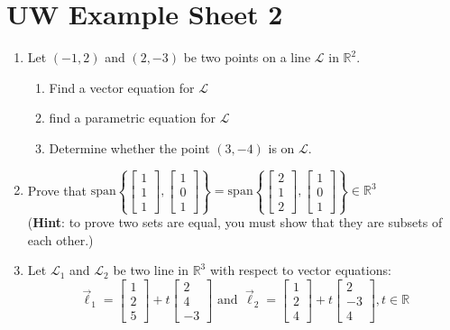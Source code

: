 \documentclass{report}
\newcommand{\R}{{\mathbb{R}}}
\begin{document}
\chapter*{UW Example Sheet 2}
\begin{enumerate}
    \item Let $(-1, 2)$ and $(2, -3)$ be two points on a line $\mathcal{L}$ in $\R^2$.
    \begin{enumerate}
        \item Find a vector equation for $\mathcal{L}$
        \item find a parametric equation for $\mathcal{L}$
        \item Determine whether the point $(3, -4)$ is on $\mathcal{L}$.
    \end{enumerate}
    \item Prove that $\text{span} \left \{\begin{bmatrix} 1 \\ 1 \\ 1\end{bmatrix}, \begin{bmatrix} 1 \\ 0\\ 1\end{bmatrix}\right \} = \text{span} \left \{\begin{bmatrix} 2 \\ 1 \\ 2\end{bmatrix}, \begin{bmatrix} 1 \\ 0\\ 1\end{bmatrix}\right \} \in \R^3$\\
    (\textbf{Hint}: to prove two sets are equal, you must show that they are subsets of each other.)
    \item Let $\mathcal{L}_1$ and $\mathcal{L}_2$ be two line in $\R^3$ with respect to vector equations: 
    $$\vec{\ell}_1 = \begin{bmatrix} 1 \\ 2\\ 5\end{bmatrix} + t\begin{bmatrix} 2 \\ 4\\ -3\end{bmatrix} \text{ and } \vec{\ell}_2 = \begin{bmatrix} 1 \\ 2\\ 4\end{bmatrix} + t\begin{bmatrix} 2 \\ -3\\ 4\end{bmatrix}, t \in \R$$

\end{enumerate}
\end{document}
